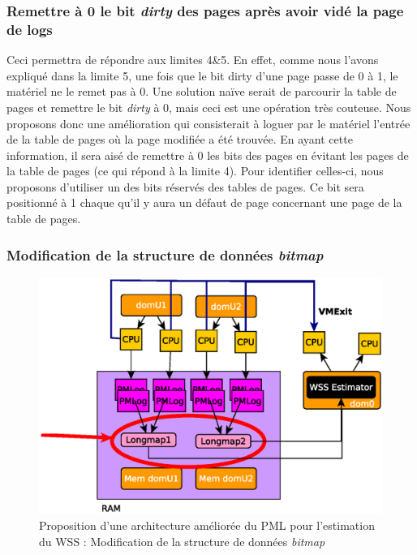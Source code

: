 \subsubsection{Remettre à 0 le bit \textit{dirty} des pages après avoir vidé la page de logs}
Ceci permettra de répondre aux limites 4\&5. En effet, comme nous l'avons expliqué dans la limite 5, une fois que le bit dirty d'une page passe de 0 à 1, le matériel ne le remet pas à 0. Une solution naïve serait de parcourir la table de pages et remettre le bit \textit{dirty} à 0, mais ceci est une opération très couteuse. Nous proposons donc une amélioration qui consisterait à loguer par le matériel l'entrée de la table de pages où la page modifiée a été trouvée. En ayant cette information, il sera aisé de remettre à 0 les bits des pages en évitant les pages de la table de pages (ce qui répond à la limite 4). Pour identifier celles-ci, nous proposons d'utiliser un des bits réservés des tables de pages. Ce bit sera positionné à 1 chaque qu'il y aura un défaut de page concernant une page de la table de pages.

\subsubsection{Modification de la structure de données \textit{bitmap}}
\begin{figure}[htp]
    \centering
    \includegraphics[scale=.8]{chapters/3/fig3/PMLOverview3}
    \caption{Proposition d'une architecture améliorée du PML pour l'estimation du WSS : Modification de la structure de données \textit{bitmap}}
    \label{fig:bitmap}
\end{figure}

